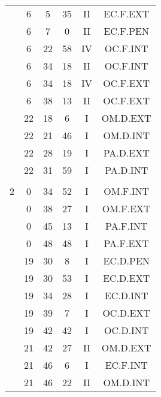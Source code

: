 \documentclass[12pt, a4paper]{article}
\begin{document}
\begin{multicols}{3}
{\begin{tabular}{c c c c c c}
	 	 	 	 & 6 & 5 & 35 & II & EC.F.EXT\\%
	 	 	 	 & 6 & 7 & 0 & II & EC.F.PEN\\%
	 	 	 	 & 6 & 22 & 58 & IV & OC.F.INT\\%
	 	 	 	 & 6 & 34 & 18 & II & OC.F.INT\\%
	 	 	 	 & 6 & 34 & 18 & IV & OC.F.EXT\\%
	 	 	 	 & 6 & 38 & 13 & II & OC.F.EXT\\%
	 	 	 	 & 22 & 18 & 6 & I & OM.D.EXT\\%
	 	 	 	 & 22 & 21 & 46 & I & OM.D.INT\\%
	 	 	 	 & 22 & 28 & 19 & I & PA.D.EXT\\%
	 	 	 	 & 22 & 31 & 59 & I & PA.D.INT\\%
	 	 	 	 & & & & & \\%
	 	 	 	2 & 0 & 34 & 52 & I & OM.F.INT\\%
	 	 	 	 & 0 & 38 & 27 & I & OM.F.EXT\\%
	 	 	 	 & 0 & 45 & 13 & I & PA.F.INT\\%
	 	 	 	 & 0 & 48 & 48 & I & PA.F.EXT\\%
	 	 	 	 & 19 & 30 & 8 & I & EC.D.PEN\\%
	 	 	 	 & 19 & 30 & 53 & I & EC.D.EXT\\%
	 	 	 	 & 19 & 34 & 28 & I & EC.D.INT\\%
	 	 	 	 & 19 & 39 & 7 & I & OC.D.EXT\\%
	 	 	 	 & 19 & 42 & 42 & I & OC.D.INT\\%
	 	 	 	 & 21 & 42 & 27 & II & OM.D.EXT\\%
	 	 	 	 & 21 & 46 & 6 & I & EC.F.INT\\%
	 	 	 	 & 21 & 46 & 22 & II & OM.D.INT\\%

\end{tabular}}
\end{multicols}
\end{document}
